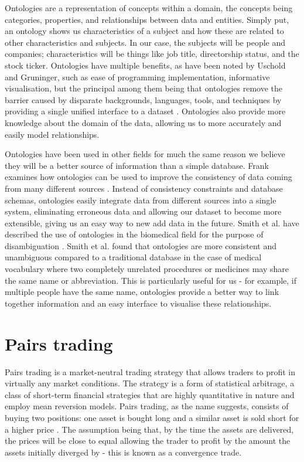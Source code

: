 \documentclass{UoYCSproject}
\begin{document}
Ontologies are a representation of concepts within a domain, the concepts being categories, properties, and relationships between data and entities. Simply put, an ontology shows us characteristics of a subject and how these are related to other characteristics and subjects. In our case, the subjects will be people and companies; characteristics will be things like job title, directorship status, and the stock ticker. Ontologies have multiple benefits, as have been noted by Uschold and Gruninger, such as ease of programming implementation, informative visualisation, but the principal among them being that ontologies remove the barrier caused by disparate backgrounds, languages, tools, and techniques by providing a single unified interface to a dataset \parencite{ontdef}. Ontologies also provide more knowledge about the domain of the data, allowing us to more accurately and easily model relationships.

Ontologies have been used in other fields for much the same reason we believe they will be a better source of information than a simple database. Frank examines how ontologies can be used to improve the consistency of data coming from many different sources \parencite{ontgeog}. Instead of consistency constraints and database schemas, ontologies easily integrate data from different sources into a single system, eliminating erroneous data and allowing our dataset to become more extensible, giving us an easy way to new add data in the future. Smith et al. have described the use of ontologies in the biomedical field for the purpose of disambiguation \parencite{ontbio}. Smith et al. found that ontologies are more consistent and unambiguous compared to a traditional database in the case of medical vocabulary where two completely unrelated procedures or medicines may share the same name or abbreviation. This is particularly useful for us - for example, if multiple people have the same name, ontologies provide a better way to link together information and an easy interface to visualise these relationships.

\section{Pairs trading}

Pairs trading is a market-neutral trading strategy that allows traders to profit in virtually any market conditions. The strategy is a form of statistical arbitrage, a class of short-term financial strategies that are highly quantitative in nature and employ mean reversion models. Pairs trading, as the name suggests, consists of buying two positions: one asset is bought long and a similar asset is sold short for a higher price \parencite{pairsdesc}. The assumption being that, by the time the assets are delivered, the prices will be close to equal allowing the trader to profit by the amount the assets initially diverged by - this is known as a convergence trade.
\end{document}
